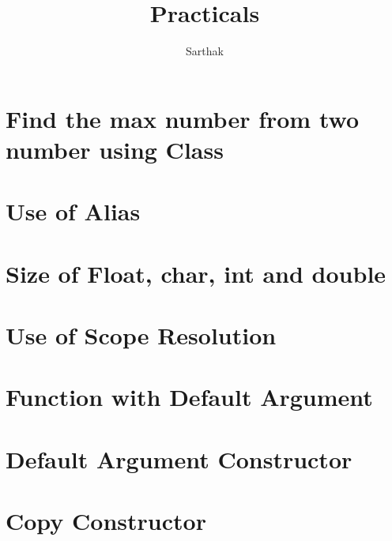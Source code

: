 \documentclass{article}
\title{Practicals}
\author{Sarthak}
\begin{document}

\maketitle
\tableofcontents
\newpage

\section{Find the max number from two number using Class}

\newpage

\section{Use of Alias}

\newpage

\section{Size of Float, char, int and double}

\newpage

\section{Use of Scope Resolution}

\newpage

\section{Function with Default Argument}

\newpage

\section{Default Argument Constructor}

\newpage

\section{Copy Constructor}

\newpage
\end{document}
